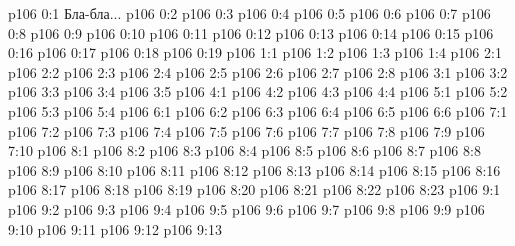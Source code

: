 \author{Мелхиседек}
\vs p106 0:1  Бла-бла...
\vs p106 0:2 
\vs p106 0:3 
\vs p106 0:4 
\vs p106 0:5 
\vs p106 0:6 
\vs p106 0:7 
\vs p106 0:8 
\vs p106 0:9 
\vs p106 0:10 \pc 
\vs p106 0:11 
\vs p106 0:12 
\vs p106 0:13 
\vs p106 0:14 
\vs p106 0:15 
\vs p106 0:16 
\vs p106 0:17 
\vs p106 0:18 \pc 
\vs p106 0:19 \pc 
{}
\vs p106 1:1 
\vs p106 1:2 
\vs p106 1:3 
\vs p106 1:4 
\vs p106 2:1 
\vs p106 2:2 \pc 
\vs p106 2:3 
\vs p106 2:4 
\vs p106 2:5 
\vs p106 2:6 \pc 
\vs p106 2:7 \pc 
\vs p106 2:8 
\vs p106 3:1 
\vs p106 3:2 
\vs p106 3:3 
\vs p106 3:4 
\vs p106 3:5 \pc 
{}
\vs p106 4:1 
\vs p106 4:2 
\vs p106 4:3 
\vs p106 4:4 
\vs p106 5:1 
\vs p106 5:2 
\vs p106 5:3 
\vs p106 5:4 
\vs p106 6:1 
\vs p106 6:2 
\vs p106 6:3 
\vs p106 6:4 
\vs p106 6:5 
\vs p106 6:6 
\vs p106 7:1 
\vs p106 7:2 
\vs p106 7:3 \pc 
\vs p106 7:4 
\vs p106 7:5 \pc 
\vs p106 7:6 
\vs p106 7:7 \pc 
\vs p106 7:8 
\vs p106 7:9 \pc 
\vs p106 7:10 
\vs p106 8:1 
\vs p106 8:2 
\vs p106 8:3 
\vs p106 8:4 
\vs p106 8:5 
\vs p106 8:6 
\vs p106 8:7 \pc 
\vs p106 8:8 \pc 
\vs p106 8:9 
\vs p106 8:10 
\vs p106 8:11 
\vs p106 8:12 \pc 
\vs p106 8:13 \pc 
\vs p106 8:14 
\vs p106 8:15 
\vs p106 8:16 
\vs p106 8:17 
\vs p106 8:18 
\vs p106 8:19 
\vs p106 8:20 
\vs p106 8:21 
\vs p106 8:22 
\vs p106 8:23 
\vs p106 9:1 
\vs p106 9:2 
\vs p106 9:3 
\vs p106 9:4 
\vs p106 9:5 \pc 
\vs p106 9:6 
\vs p106 9:7 
\vs p106 9:8 
\vs p106 9:9 \pc 
\vs p106 9:10 
\vs p106 9:11 \pc 
\vs p106 9:12 
\vsetoff
\vs p106 9:13 
\quizlink
